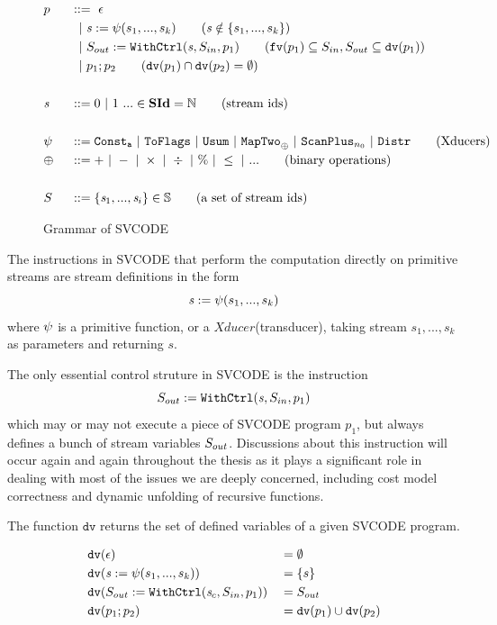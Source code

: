 \begin{figure}[!h] \large
	\begin{alignat*}{2}
	&p  && :: = \ \epsilon \\ 
	& &&\ \ | \ \sdef{\s}{\psi(s_1,...,s_k)}  \tag{$\s \notin \{s_1,...,s_k\}$}\\
	& &&\ \ | \ \withctrl{\s}{p_1}{\Sin}{\Sout}  \tag{$ \FV{p_1} \subseteq \Sin, \Sout \subseteq \dv{p_1} $} \\
	& &&\ \ | \ p_1;p_2  \tag{$\dv{p_1} \cap \dv{p_2} = \emptyset$} \\
	\\
	& \s && ::= 0 \ | \ 1 \ ... \in \SId  = \mathbb{N}   \tag{stream ids}\\
	\\
	& \psi \ && ::= \consta{a} \ | \ \toflag  
	\ | \ \usum \ | \ \maptwo{\oplus} \ | \ \scan_{n_0} \ | \ \distr  \tag{Xducers} \\
	& \oplus \ && :: = + \ | \ - \ | \ \times \ | \ \div \ | \ \% \ | \ \le \ | \ ...  \tag{binary operations}\\
	\\
	&  \S && ::= \{\s_1,..., \s_i\} \in \sset  \tag{a set of stream ids}\\
	\end{alignat*}
\caption{Grammar of SVCODE \label{fig-svcode-grammar}}
\end{figure}

The instructions in SVCODE that perform the computation directly on primitive streams are stream definitions in the form
$$\mathit{s} := \psi(s_1,...,s_k) $$  
where $\psi$ is a primitive function, or a $Xducer$(transducer), taking stream $s_1,...,s_k$ as parameters and returning $s$. 

The only essential control struture in SVCODE is the instruction 
$$S_{out} := \mathtt{WithCtrl}(\mathit{s},S_{in},p_1) $$
which may or may not execute a piece of SVCODE program $p_1$, but always defines a bunch of stream variables $S_{out}$. Discussions about this \wc 
instruction will occur again and again throughout the thesis as it plays a significant role in dealing with most of the issues we are deeply concerned, 
including cost model correctness and dynamic unfolding of recursive functions. 




The function $\texttt{dv}$ returns the set of defined variables of a given SVCODE program.

\begin{alignat*}{2}
&\mathtt{dv}(\epsilon) && =  \emptyset \\
&\mathtt{dv}(\mathit{s} := \psi(s_1,...,s_k)) && =  \{s\} \\
&\mathtt{dv}(S_{out} := \mathtt{WithCtrl}(\mathit{s}_c,S_{in},p_1)) && =   S_{out} \\
&\mathtt{dv}(p_1;p_2) && =  \mathtt{dv}(p_1) \cup \mathtt{dv}(p_2) \\
\end{alignat*}

